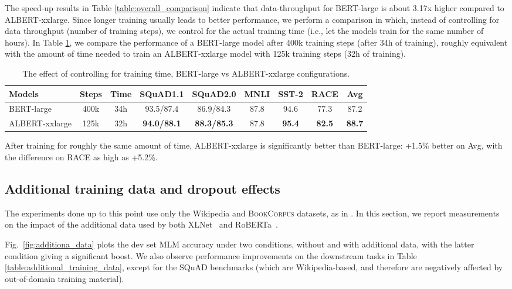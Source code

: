 The speed-up results in Table \ref{table:overall_comparison} indicate that data-throughput for BERT-large is about 3.17x higher compared to ALBERT-xxlarge.
Since longer training usually leads to better performance, we perform a comparison in which, instead of controlling for data throughput (number of training steps), we control for the actual training time (i.e., let the models train for the same number of hours).
In Table \ref{table:same-training-time}, we compare the performance of a  BERT-large model after 400k training steps (after 34h of training), roughly equivalent with the amount of time needed to train an ALBERT-xxlarge model with 125k training steps (32h of training).


\begin{table}[!htbp] 
\small
\centering
\begin{tabular}{ l c c|  c c c c c | c }
Models	& Steps& Time	&SQuAD1.1	&SQuAD2.0	&MNLI	&SST-2	&RACE & Avg \\
\hline
BERT-large & 400k  & 34h      &93.5/87.4	&86.9/84.3	&87.8	&94.6	&77.3	&87.2\\
ALBERT-xxlarge & 125k & 32h  &\textbf{94.0/88.1}	&\textbf{88.3/85.3}	&87.8	&\textbf{95.4}	&\textbf{82.5}   &\textbf{88.7}\\
\end{tabular}
\caption{The effect of controlling for training time, BERT-large vs ALBERT-xxlarge configurations.}
\label{table:same-training-time}
\end{table}

After training for roughly the same amount of time, ALBERT-xxlarge is significantly better than BERT-large: +1.5\% better on Avg, with the difference on RACE as high as +5.2\%.


\subsection{Additional training data and dropout effects}
The experiments done up to this point use only the Wikipedia and \textsc{BookCorpus} datasets, as in \citep{devlin2018bert}.
In this section, we report measurements on the impact of the additional data used by both XLNet~\citep{yang2019xlnet} and RoBERTa~\citep{liu2019roberta}.

Fig.~\ref{fig:additiona_data} plots the dev set MLM accuracy under two conditions, without and with additional data, with the latter condition giving a significant boost.
We also observe  performance improvements on the downstream tasks in Table \ref{table:additional_training_data}, except for the SQuAD benchmarks (which are Wikipedia-based, and therefore are negatively affected by out-of-domain training material).

